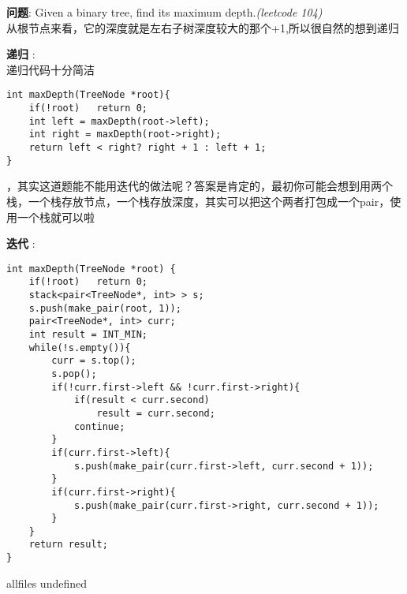 \documentclass{article}
\begin{document}
\begin{CJK}{UTF8}{gbsn}     %

\else
	
\begin{description}
	\item{\textbf{问题}}: Given a binary tree, find its maximum depth.\textit{(leetcode 104)}
	\\从根节点来看，它的深度就是左右子树深度较大的那个+1,所以很自然的想到递归
	\item{\textbf{递归}} : 
	\\递归代码十分简洁
	\begin{lstlisting}
int maxDepth(TreeNode *root){
	if(!root)   return 0;
	int left = maxDepth(root->left);
	int right = maxDepth(root->right);
	return left < right? right + 1 : left + 1;
}
	\end{lstlisting}
	，其实这道题能不能用迭代的做法呢？答案是肯定的，最初你可能会想到用两个栈，一个栈存放节点，一个栈存放深度，其实可以把这个两者打包成一个pair，使用一个栈就可以啦
	\item{\textbf{迭代}} : 
	\begin{lstlisting}
int maxDepth(TreeNode *root) {
	if(!root)	return 0;
	stack<pair<TreeNode*, int> > s;
	s.push(make_pair(root, 1));
	pair<TreeNode*, int> curr;
	int result = INT_MIN;
	while(!s.empty()){
		curr = s.top();
		s.pop();
		if(!curr.first->left && !curr.first->right){
			if(result < curr.second)
				result = curr.second;
			continue;
		}
		if(curr.first->left){
			s.push(make_pair(curr.first->left, curr.second + 1));
		}
		if(curr.first->right){
			s.push(make_pair(curr.first->right, curr.second + 1));
		}
	}
	return result;
}
	\end{lstlisting}
\end{description}

\fi

\ifx allfiles undefined
\end{CJK}
\end{document}
